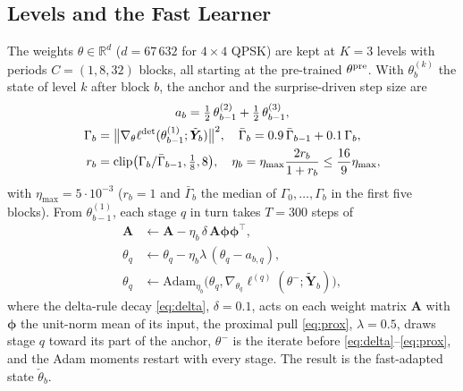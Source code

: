 \documentclass[journal]{IEEEtran}
\theoremstyle{remark}
\begin{document}
\subsection{Levels and the Fast Learner}\label{sec:fast}
The weights $\theta\in\mathbb R^d$ ($d=67\,632$ for $4\times4$ QPSK) are kept at $K=3$ levels with
periods $C=(1,8,32)$ blocks, all starting at the pre-trained $\theta^{\rm pre}$. With $\theta^{(k)}_b$
the state of level $k$ after block $b$, the anchor and the surprise-driven step size are
\begin{gather}
a_b=\tfrac12\,\theta^{(2)}_{b-1}+\tfrac12\,\theta^{(3)}_{b-1},\label{eq:anchor}\\
\begin{aligned}
\Gamma_b&=\big\|\nabla_\theta\ell^{\rm det}(\theta^{(1)}_{b-1};\tilde{\bm Y}_b)\big\|^2,\quad
\bar\Gamma_b=0.9\,\bar\Gamma_{b-1}+0.1\,\Gamma_b,\\
r_b&=\mathrm{clip}\big(\Gamma_b/\bar\Gamma_{b-1},\tfrac18,8\big),\quad
\eta_b=\eta_{\max}\frac{2r_b}{1+r_b}\le\frac{16}{9}\eta_{\max},
\end{aligned}\label{eq:surprise}
\end{gather}
with $\eta_{\max}=5\cdot10^{-3}$ ($r_b=1$ and $\bar\Gamma_b$ the median of $\Gamma_0,\dots,\Gamma_b$ in the first five blocks). From $\theta^{(1)}_{b-1}$, each
stage $q$ in turn \cite{shlezinger2021} takes $T=300$ steps of
\begin{align}
\bm A&\leftarrow\bm A-\eta_b\,\delta\,\bm A\bm\phi\bm\phi^{\top},\label{eq:delta}\\
\theta_q&\leftarrow\theta_q-\eta_b\lambda\,(\theta_q-a_{b,q}),\label{eq:prox}\\
\theta_q&\leftarrow\mathrm{Adam}_{\eta_b}\big(\theta_q,\nabla_{\theta_q}\ell^{(q)}(\theta^{-};\tilde{\bm Y}_b)\big),\label{eq:adam}
\end{align}
where the delta-rule decay \eqref{eq:delta}, $\delta=0.1$, acts on each weight matrix $\bm A$ with
$\bm\phi$ the unit-norm mean of its input, the proximal pull \eqref{eq:prox}, $\lambda=0.5$, draws stage
$q$ toward its part of the anchor, $\theta^{-}$ is the iterate before \eqref{eq:delta}--\eqref{eq:prox},
and the Adam moments restart with every stage. The result is the fast-adapted state $\check\theta_b$.
\end{document}

